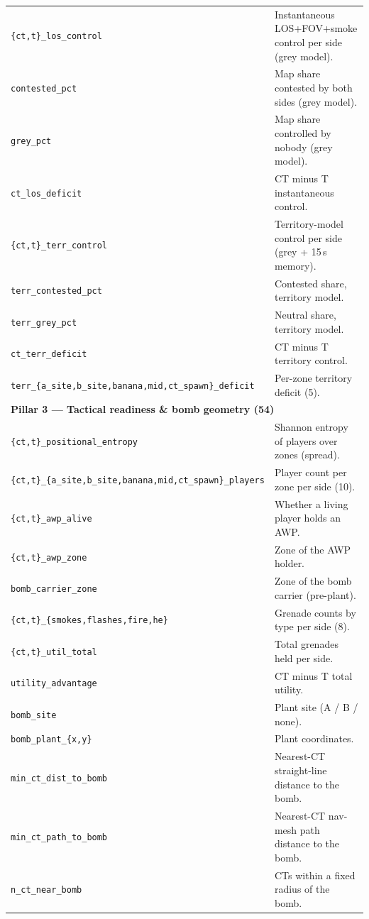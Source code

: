 \documentclass[11pt,a4paper]{article}
\begin{document}
{\begin{longtable}{p{}p{}}
\texttt{\{ct,t\}\_los\_control} & Instantaneous LOS+FOV+smoke control per side (grey model). \\
\texttt{contested\_pct} & Map share contested by both sides (grey model). \\
\texttt{grey\_pct} & Map share controlled by nobody (grey model). \\
\texttt{ct\_los\_deficit} & CT minus T instantaneous control. \\
\texttt{\{ct,t\}\_terr\_control} & Territory-model control per side (grey + 15\,s memory). \\
\texttt{terr\_contested\_pct} & Contested share, territory model. \\
\texttt{terr\_grey\_pct} & Neutral share, territory model. \\
\texttt{ct\_terr\_deficit} & CT minus T territory control. \\
\texttt{terr\_\{a\_site,b\_site,banana,mid,ct\_spawn\}\_deficit} & Per-zone territory deficit (5). \\
\midrule
\multicolumn{2}{l}{\textbf{Pillar 3 — Tactical readiness \& bomb geometry (54)}}\\
\midrule
\texttt{\{ct,t\}\_positional\_entropy} & Shannon entropy of players over zones (spread). \\
\texttt{\{ct,t\}\_\{a\_site,b\_site,banana,mid,ct\_spawn\}\_players} & Player count per zone per side (10). \\
\texttt{\{ct,t\}\_awp\_alive} & Whether a living player holds an AWP. \\
\texttt{\{ct,t\}\_awp\_zone} & Zone of the AWP holder. \\
\texttt{bomb\_carrier\_zone} & Zone of the bomb carrier (pre-plant). \\
\texttt{\{ct,t\}\_\{smokes,flashes,fire,he\}} & Grenade counts by type per side (8). \\
\texttt{\{ct,t\}\_util\_total} & Total grenades held per side. \\
\texttt{utility\_advantage} & CT minus T total utility. \\
\texttt{bomb\_site} & Plant site (A / B / none). \\
\texttt{bomb\_plant\_\{x,y\}} & Plant coordinates. \\
\texttt{min\_ct\_dist\_to\_bomb} & Nearest-CT straight-line distance to the bomb. \\
\texttt{min\_ct\_path\_to\_bomb} & Nearest-CT nav-mesh path distance to the bomb. \\
\texttt{n\_ct\_near\_bomb} & CTs within a fixed radius of the bomb. \\

\end{longtable}}
\end{document}
